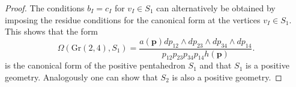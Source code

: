 \documentclass[10pt,a4paper]{amsart}
\begin{document}
\begin{proof}
The conditions $b_I=c_I$ for $v_I\in S_1$ can alternatively be obtained by imposing the residue conditions for the canonical form at the vertices $v_I \in S_1$. This shows that the form 
$$
\Omega(\mathrm{Gr}(2,4), S_1) = \dfrac{a(\mathbf{p}) dp_{12}\wedge dp_{23} \wedge dp_{34} \wedge dp_{14} }{p_{12}p_{23}p_{34}p_{14} h(\mathbf{p})}.
$$
is the canonical form of the positive pentahedron $S_1$ and that $S_1$ is a positive geometry. Analogously one can show that $S_2$ is also a positive geometry.

\end{proof}
\end{document}
